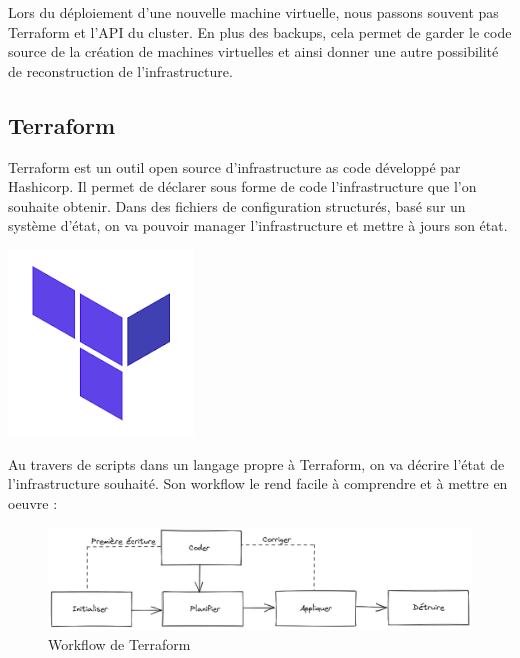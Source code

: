 \documentclass[12pt]{article}
\begin{document}
Lors du déploiement d'une nouvelle machine virtuelle, nous passons souvent pas Terraform et l'API du cluster. 
En plus des backups, cela permet de garder le code source de la création de machines virtuelles et ainsi donner une autre possibilité de reconstruction de l'infrastructure.

\newpage
\subsection{Terraform}
\noindent%
\begin{minipage}{.7\textwidth}%
Terraform est un outil open source d'infrastructure as code développé par Hashicorp. 
Il permet de déclarer sous forme de code l'infrastructure que l'on souhaite obtenir. 
Dans des fichiers de configuration structurés, basé sur un système d'état, on va pouvoir manager l'infrastructure et mettre à jours son état. \\

\end{minipage}%
\hfill
\begin{minipage}{.3\textwidth}%
\begin{center}
\includegraphics[scale=0.3]{src/Terraform.png}
\end{center}
\end{minipage}%

Au travers de scripts dans un langage propre à Terraform, on va décrire l'état de l'infrastructure souhaité. 
Son workflow le rend facile à comprendre et à mettre en oeuvre :
\begin{figure}[!ht]
    \centering
    \includegraphics[width=\textwidth]{src/Terraform_schema.png}
    \caption{Workflow de Terraform}
    \label{fig:terraform_schemal}
\end{figure}
\end{document}
